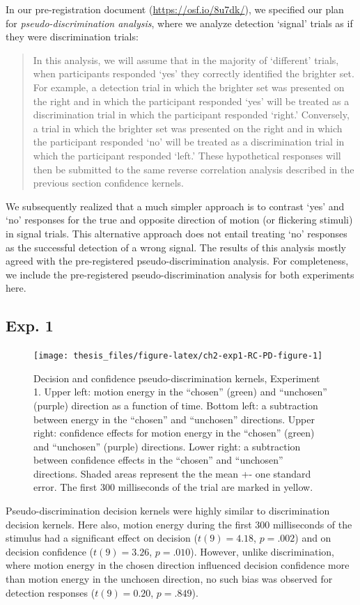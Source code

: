 \documentclass[12pt,twoside]{reedthesis}
\begin{document}
In our pre-registration document (\url{https://osf.io/8u7dk/}), we specified our plan for \emph{pseudo-discrimination analysis}, where we analyze detection `signal' trials as if they were discrimination trials:
\begin{quote}
In this analysis, we will assume that in the majority of `different' trials, when participants responded `yes' they correctly identified the brighter set. For example, a detection trial in which the brighter set was presented on the right and in which the participant responded `yes' will be treated as a discrimination trial in which the participant responded `right.' Conversely, a trial in which the brighter set was presented on the right and in which the participant responded `no' will be treated as a discrimination trial in which the participant responded `left.' These hypothetical responses will then be submitted to the same reverse correlation analysis described in the previous section confidence kernels.
\end{quote}
We subsequently realized that a much simpler approach is to contrast `yes' and `no' responses for the true and opposite direction of motion (or flickering stimuli) in signal trials. This alternative approach does not entail treating `no' responses as the successful detection of a wrong signal. The results of this analysis mostly agreed with the pre-registered pseudo-discrimination analysis. For completeness, we include the pre-registered pseudo-discrimination analysis for both experiments here.



\hypertarget{exp.-1}{%
\subsection{Exp. 1}\label{exp.-1}}
\begin{figure}
\texttt{[image: thesis\_files/figure-latex/ch2-exp1-RC-PD-figure-1]} \caption[Pseudo-discrimination kernels for detection signal trials.]{Decision and confidence pseudo-discrimination kernels, Experiment 1. Upper left: motion energy in the ``chosen'' (green) and ``unchosen'' (purple) direction as a function of time. Bottom left: a subtraction between energy in the ``chosen'' and ``unchosen'' directions. Upper right: confidence effects for motion energy in the ``chosen'' (green) and ``unchosen'' (purple) directions. Lower right: a subtraction between confidence effects in the ``chosen'' and ``unchosen'' directions. Shaded areas represent the the mean +- one standard error. The first 300 milliseconds of the trial are marked in yellow.}\label{fig:ch2-exp1-RC-PD-figure}
\end{figure}
Pseudo-discrimination decision kernels were highly similar to discrimination decision kernels. Here also, motion energy during the first 300 milliseconds of the stimulus had a significant effect on decision (\(t(9) = 4.18\), \(p = .002\)) and on decision confidence (\(t(9) = 3.26\), \(p = .010\)). However, unlike discrimination, where motion energy in the chosen direction influenced decision confidence more than motion energy in the unchosen direction, no such bias was observed for detection responses (\(t(9) = 0.20\), \(p = .849\)).
\end{document}
